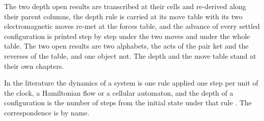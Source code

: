 The two depth open results are transcribed at their cells and re-derived along their parent columns, the depth rule is carried at its move table with its two electromagnetic moves re-met at the forces table, and the advance of every settled configuration is printed step by step under the two moves and under the whole table. The two open results are two alphabets, the acts of the pair ket and the reverses of the table, and one object not. The depth and the move table stand at their own chapters.
\begin{chbridge}
In the literature the dynamics of a system is one rule applied one step per unit of the clock, a Hamiltonian flow or a cellular automaton, and the depth of a configuration is the number of steps from the initial state under that rule \cite{Newton1687,Weinberg1995}. The correspondence is by name.
\end{chbridge}

